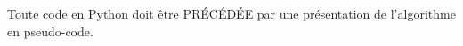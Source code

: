 

Toute code en Python doit être PR\'EC\'ED\'EE par une présentation de l'algorithme en pseudo-code.



